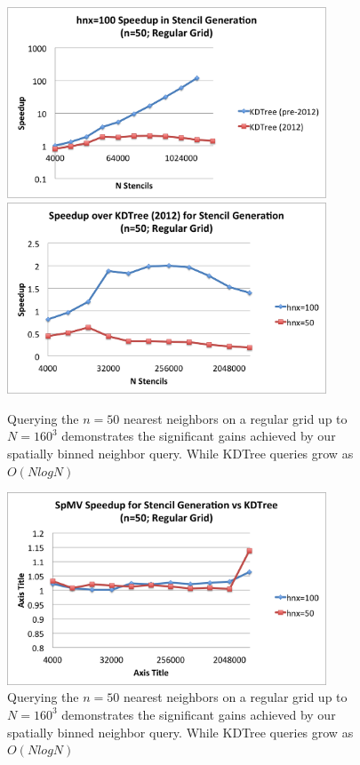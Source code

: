 \documentclass[11pt]{report}
\begin{document}
\begin{figure}
\centering
\includegraphics[width=9.5cm]{../figures/stencils/kdtree_old_reg_subsets_4m_stencil_gen_speedup.png}
\includegraphics[width=9.5cm]{../figures/stencils/reg_subsets_4m_stencil_gen_speedup.png}
\caption{Querying the $n=50$ nearest neighbors on a regular grid up to $N=160^3$ demonstrates the significant gains achieved by our spatially binned neighbor query. While KDTree queries grow as $O(N log N)$}
\label{fig:hash_results}
\end{figure}
\begin{figure}
\centering
\includegraphics[width=9.5cm]{../figures/stencils/reg_subsets_4m_spmv_speedup.png}
\caption{Querying the $n=50$ nearest neighbors on a regular grid up to $N=160^3$ demonstrates the significant gains achieved by our spatially binned neighbor query. While KDTree queries grow as $O(N log N)$}
\label{fig:hash_results}
\end{figure}
\end{document}
